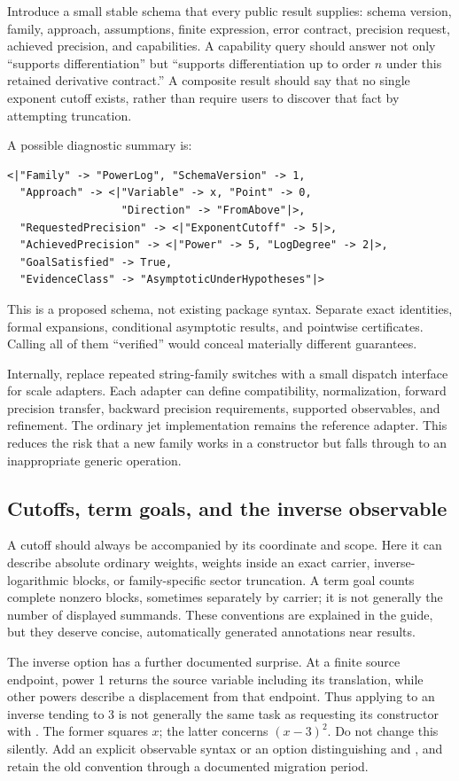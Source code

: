 \documentclass[11pt,a4paper]{article}
\newcommand{\code}[1]{\texttt{\detokenize{#1}}}
\begin{document}
Introduce a small stable schema that every public result supplies: schema version, family, approach, assumptions, finite expression, error contract, precision request, achieved precision, and capabilities. A capability query should answer not only ``supports differentiation'' but ``supports differentiation up to order $n$ under this retained derivative contract.'' A composite result should say that no single exponent cutoff exists, rather than require users to discover that fact by attempting truncation.

A possible diagnostic summary is:
\begin{lstlisting}
<|"Family" -> "PowerLog", "SchemaVersion" -> 1,
  "Approach" -> <|"Variable" -> x, "Point" -> 0,
                  "Direction" -> "FromAbove"|>,
  "RequestedPrecision" -> <|"ExponentCutoff" -> 5|>,
  "AchievedPrecision" -> <|"Power" -> 5, "LogDegree" -> 2|>,
  "GoalSatisfied" -> True,
  "EvidenceClass" -> "AsymptoticUnderHypotheses"|>
\end{lstlisting}
This is a proposed schema, not existing package syntax. Separate exact identities, formal expansions, conditional asymptotic results, and pointwise certificates. Calling all of them ``verified'' would conceal materially different guarantees.

Internally, replace repeated string-family switches with a small dispatch interface for scale adapters. Each adapter can define compatibility, normalization, forward precision transfer, backward precision requirements, supported observables, and refinement. The ordinary jet implementation remains the reference adapter. This reduces the risk that a new family works in a constructor but falls through to an inappropriate generic operation.

\subsection{Cutoffs, term goals, and the inverse observable}

A cutoff should always be accompanied by its coordinate and scope. Here it can describe absolute ordinary weights, weights inside an exact carrier, inverse-logarithmic blocks, or family-specific sector truncation. A term goal counts complete nonzero blocks, sometimes separately by carrier; it is not generally the number of displayed summands. These conventions are explained in the guide, but they deserve concise, automatically generated annotations near results.\cite{guide}

The inverse \code{"Power"} option has a further documented surprise. At a finite source endpoint, power 1 returns the source variable including its translation, while other powers describe a displacement from that endpoint. Thus applying \code{SeriesPower[s,2]} to an inverse tending to 3 is not generally the same task as requesting its constructor with \code{"Power" -> 2}. The former squares $x$; the latter concerns $(x-3)^2$. Do not change this silently. Add an explicit observable syntax or an option distinguishing \code{"Source"} and \code{"Displacement"}, and retain the old convention through a documented migration period.\cite{guide,core}
\end{document}
